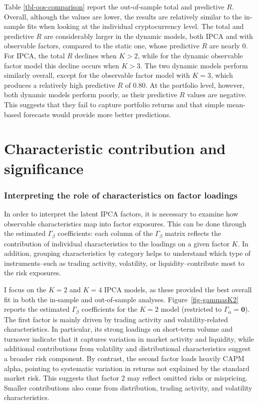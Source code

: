 \documentclass[
  12pt,
  a4paper,
  openany]{scrbook}
\begin{document}
Table \ref{tbl-oos-comparison} report the out-of-sample total and
predictive \(R\). Overall, although the values are lower, the results
are relatively similar to the in-sample fits when looking at the
individual cryptocurrency level. The total and predictive \(R\) are
considerably larger in the dynamic models, both IPCA and with observable
factors, compared to the static one, whose predictive \(R\) are nearly
0. For IPCA, the total \(R\) declines when \(K > 2\), while for the
dynamic observable factor model this decline occurs when \(K > 3\). The
two dynamic models perform similarly overall, except for the observable
factor model with \(K=3\), which produces a relatively high predictive
\(R\) of 0.80. At the portfolio level, however, both dynamic models
perform poorly, as their predictive \(R\) values are negative. This
suggests that they fail to capture portfolio returns and that simple
mean-based forecasts would provide more better predictions.

\section{Characteristic contribution and
significance}\label{characteristic-contribution-and-significance}

\subsubsection{Interpreting the role of characteristics on factor
loadings}\label{interpreting-the-role-of-characteristics-on-factor-loadings}

In order to interpret the latent IPCA factors, it is necessary to
examine how observable characteristics map into factor exposures. This
can be done through the estimated \(\Gamma_\beta\) coefficients: each
column of the \(\Gamma_\beta\) matrix reflects the contribution of
individual characteristics to the loadings on a given factor \(K\). In
addition, grouping characteristics by category helps to understand which
type of instruments--such as trading activity, volatility, or
liquidity--contribute most to the risk exposures.

I focus on the \(K=2\) and \(K=4\) IPCA models, as these provided the
best overall fit in both the in-sample and out-of-sample analyses.
Figure~\ref{fig-gammasK2} reports the estimated \(\Gamma_\beta\)
coefficients for the \(K=2\) model (restricted to
\(\Gamma_\alpha = \mathbf{0}\)). The first factor is mainly driven by
trading activity and volatility-related characteristics. In particular,
its strong loadings on short-term volume and turnover indicate that it
captures variation in market activity and liquidity, while additional
contributions from volatility and distributional characteristics suggest
a broader risk component. By contrast, the second factor loads heavily
CAPM alpha, pointing to systematic variation in returns not explained by
the standard market risk. This suggests that factor 2 may reflect
omitted risks or mispricing. Smaller contributions also come from
distribution, trading activity, and volatility characteristics.
\end{document}
